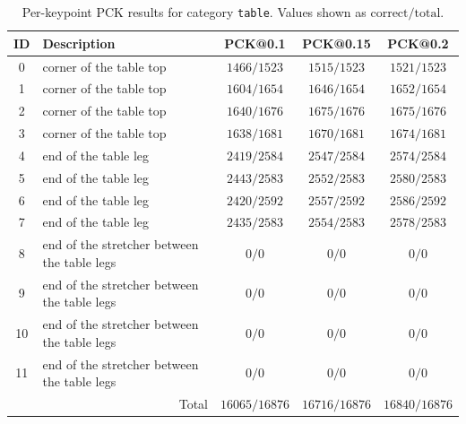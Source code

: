 \begin{table}[h]
\centering
\small
\caption{Per-keypoint PCK results for category \texttt{table}. Values shown as $\text{correct}/\text{total}$.}
\label{tab:pck_table}
\begin{tabular}{cl ccc}
\toprule
ID & Description & PCK@0.1 & PCK@0.15 & PCK@0.2 \\
\midrule
0 & corner of the table top & $1466/1523$ & $1515/1523$ & $1521/1523$ \\
1 & corner of the table top & $1604/1654$ & $1646/1654$ & $1652/1654$ \\
2 & corner of the table top & $1640/1676$ & $1675/1676$ & $1675/1676$ \\
3 & corner of the table top & $1638/1681$ & $1670/1681$ & $1674/1681$ \\
4 & end of the table leg & $2419/2584$ & $2547/2584$ & $2574/2584$ \\
5 & end of the table leg & $2443/2583$ & $2552/2583$ & $2580/2583$ \\
6 & end of the table leg & $2420/2592$ & $2557/2592$ & $2586/2592$ \\
7 & end of the table leg & $2435/2583$ & $2554/2583$ & $2578/2583$ \\
8 & end of the stretcher between the table legs & $0/0$ & $0/0$ & $0/0$ \\
9 & end of the stretcher between the table legs & $0/0$ & $0/0$ & $0/0$ \\
10 & end of the stretcher between the table legs & $0/0$ & $0/0$ & $0/0$ \\
11 & end of the stretcher between the table legs & $0/0$ & $0/0$ & $0/0$ \\
\midrule
\multicolumn{2}{r}{Total} & $16065/16876$ & $16716/16876$ & $16840/16876$ \\
\bottomrule
\end{tabular}
\end{table}

